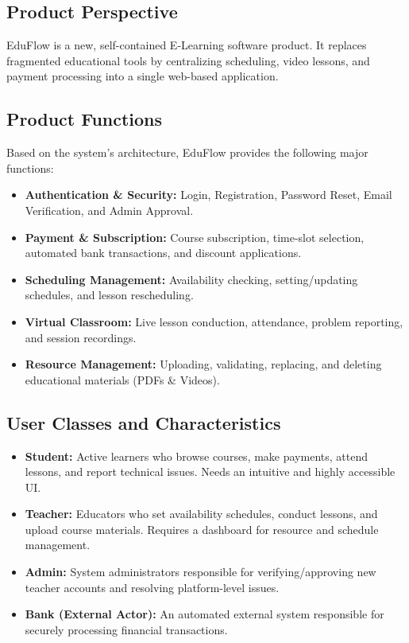\documentclass[11pt,a4paper]{article}
\begin{document}
\subsection{Product Perspective}
EduFlow is a new, self-contained E-Learning software product. It replaces fragmented educational tools by centralizing scheduling, video lessons, and payment processing into a single web-based application.

\subsection{Product Functions}
Based on the system's architecture, EduFlow provides the following major functions:
\begin{itemize}
    \item \textbf{Authentication \& Security:} Login, Registration, Password Reset, Email Verification, and Admin Approval.
    \item \textbf{Payment \& Subscription:} Course subscription, time-slot selection, automated bank transactions, and discount applications.
    \item \textbf{Scheduling Management:} Availability checking, setting/updating schedules, and lesson rescheduling.
    \item \textbf{Virtual Classroom:} Live lesson conduction, attendance, problem reporting, and session recordings.
    \item \textbf{Resource Management:} Uploading, validating, replacing, and deleting educational materials (PDFs \& Videos).
\end{itemize}

\subsection{User Classes and Characteristics}
\begin{itemize}
    \item \textbf{Student:} Active learners who browse courses, make payments, attend lessons, and report technical issues. Needs an intuitive and highly accessible UI.
    \item \textbf{Teacher:} Educators who set availability schedules, conduct lessons, and upload course materials. Requires a dashboard for resource and schedule management.
    \item \textbf{Admin:} System administrators responsible for verifying/approving new teacher accounts and resolving platform-level issues.
    \item \textbf{Bank (External Actor):} An automated external system responsible for securely processing financial transactions.
\end{itemize}
\end{document}
